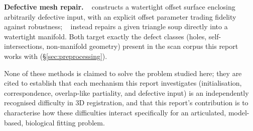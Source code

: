 \textbf{Defective mesh repair.} ~\cite{alphawrap}
constructs a watertight offset surface enclosing arbitrarily defective
input, with an explicit offset parameter trading fidelity against
robustness; ~\cite{manifoldplus} instead repairs a given
triangle soup directly into a watertight manifold. Both target exactly the
defect classes (holes, self-intersections, non-manifold geometry)
present in the scan corpus this report works with (\S\ref{sec:preprocessing}).

None of these methods is claimed to solve the problem studied here; they are
cited to establish that each mechanism this report investigates
(initialisation, correspondence, overlap-like partiality, and defective
input) is an independently recognised difficulty in 3D registration, and
that this report's contribution is to characterise how these difficulties
interact specifically for an articulated, model-based, biological fitting
problem.

